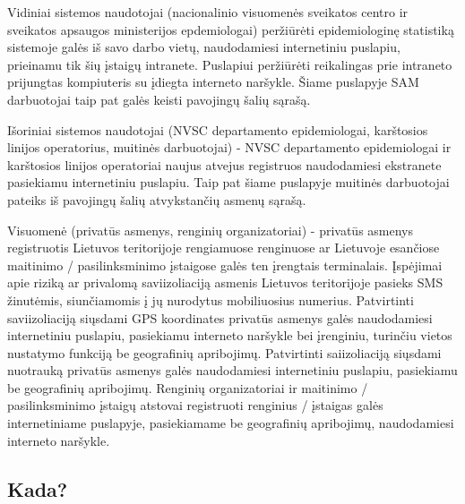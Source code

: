 \documentclass{VUMIFPSkursinis}
\begin{document}
Vidiniai sistemos naudotojai (nacionalinio visuomenės sveikatos centro ir sveikatos apsaugos ministerijos epdemiologai) peržiūrėti epidemiologinę statistiką sistemoje galės 
iš savo darbo vietų, naudodamiesi internetiniu puslapiu, prieinamu tik šių įstaigų intranete. Puslapiui peržiūrėti reikalingas prie intraneto prijungtas kompiuteris su įdiegta 
interneto naršykle. Šiame puslapyje SAM darbuotojai taip pat galės keisti pavojingų šalių sąrašą.

Išoriniai sistemos naudotojai (NVSC departamento epidemiologai, karštosios linijos operatorius, muitinės darbuotojai) - NVSC departamento epidemiologai ir karštosios linijos operatoriai naujus atvejus registruos naudodamiesi 
ekstranete pasiekiamu internetiniu puslapiu. Taip pat šiame puslapyje muitinės darbuotojai pateiks iš pavojingų šalių atvykstančių asmenų sąrašą.

Visuomenė (privatūs asmenys, renginių organizatoriai) - privatūs asmenys registruotis Lietuvos teritorijoje rengiamuose renginuose ar Lietuvoje esančiose maitinimo / pasilinksminimo 
įstaigose galės ten įrengtais terminalais. Įspėjimai apie riziką ar privalomą saviizoliaciją asmenis Lietuvos teritorijoje pasieks SMS žinutėmis, siunčiamomis į jų nurodytus 
mobiliuosius numerius. Patvirtinti saviizoliaciją siųsdami GPS koordinates privatūs asmenys galės naudodamiesi internetiniu puslapiu, pasiekiamu interneto naršykle bei įrenginiu, 
turinčiu vietos nustatymo funkciją be geografinių apribojimų. Patvirtinti saiizoliaciją siųsdami nuotrauką privatūs asmenys galės naudodamiesi internetiniu puslapiu, pasiekiamu 
be geografinių apribojimų. Renginių organizatoriai ir maitinimo / pasilinksminimo įstaigų atstovai registruoti renginius / įstaigas galės internetiniame puslapyje, pasiekiamame 
be geografinių apribojimų, naudodamiesi interneto naršykle.

\subsection{Kada?}
\end{document}

